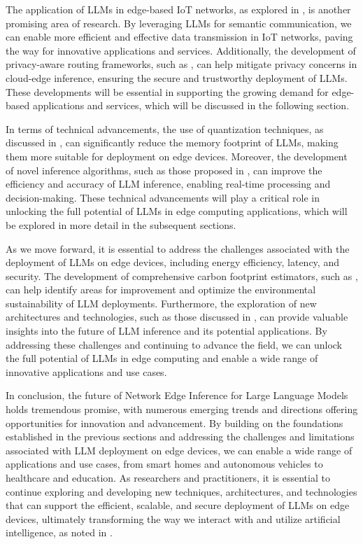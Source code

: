 \documentclass[11pt,a4paper]{article}
\begin{document}
The application of LLMs in edge-based IoT networks, as explored in \cite{arxiv:2407.20970}, is another promising area of research. By leveraging LLMs for semantic communication, we can enable more efficient and effective data transmission in IoT networks, paving the way for innovative applications and services. Additionally, the development of privacy-aware routing frameworks, such as \cite{arxiv:2511.22788}, can help mitigate privacy concerns in cloud-edge inference, ensuring the secure and trustworthy deployment of LLMs. These developments will be essential in supporting the growing demand for edge-based applications and services, which will be discussed in the following section.

In terms of technical advancements, the use of quantization techniques, as discussed in \cite{arxiv:2403.01384}, can significantly reduce the memory footprint of LLMs, making them more suitable for deployment on edge devices. Moreover, the development of novel inference algorithms, such as those proposed in \cite{arxiv:2410.18248}, can improve the efficiency and accuracy of LLM inference, enabling real-time processing and decision-making. These technical advancements will play a critical role in unlocking the full potential of LLMs in edge computing applications, which will be explored in more detail in the subsequent sections.

As we move forward, it is essential to address the challenges associated with the deployment of LLMs on edge devices, including energy efficiency, latency, and security. The development of comprehensive carbon footprint estimators, such as \cite{arxiv:2511.08575}, can help identify areas for improvement and optimize the environmental sustainability of LLM deployments. Furthermore, the exploration of new architectures and technologies, such as those discussed in \cite{doi:10.32996/jcsts.2025.7.4.38}, can provide valuable insights into the future of LLM inference and its potential applications. By addressing these challenges and continuing to advance the field, we can unlock the full potential of LLMs in edge computing and enable a wide range of innovative applications and use cases.

In conclusion, the future of Network Edge Inference for Large Language Models holds tremendous promise, with numerous emerging trends and directions offering opportunities for innovation and advancement. By building on the foundations established in the previous sections and addressing the challenges and limitations associated with LLM deployment on edge devices, we can enable a wide range of applications and use cases, from smart homes and autonomous vehicles to healthcare and education. As researchers and practitioners, it is essential to continue exploring and developing new techniques, architectures, and technologies that can support the efficient, scalable, and secure deployment of LLMs on edge devices, ultimately transforming the way we interact with and utilize artificial intelligence, as noted in \cite{doi:10.1145/3788870}.
\end{document}
